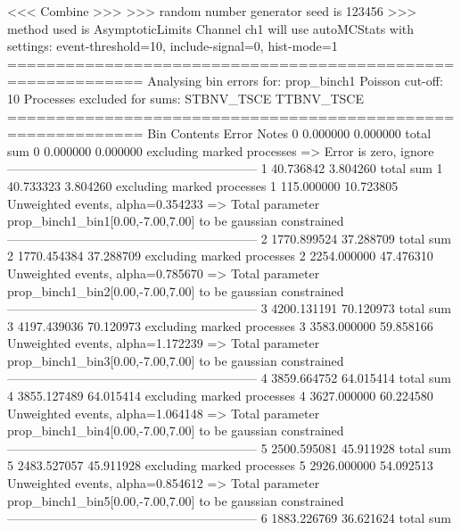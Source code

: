  <<< Combine >>> 
>>> random number generator seed is 123456
>>> method used is AsymptoticLimits
Channel ch1 will use autoMCStats with settings: event-threshold=10, include-signal=0, hist-mode=1
============================================================
Analysing bin errors for: prop_binch1
Poisson cut-off: 10
Processes excluded for sums: STBNV_TSCE TTBNV_TSCE
============================================================
Bin        Contents        Error           Notes                         
0          0.000000        0.000000        total sum                     
0          0.000000        0.000000        excluding marked processes    
  => Error is zero, ignore      
------------------------------------------------------------
1          40.736842       3.804260        total sum                     
1          40.733323       3.804260        excluding marked processes    
1          115.000000      10.723805       Unweighted events, alpha=0.354233
  => Total parameter prop_binch1_bin1[0.00,-7.00,7.00] to be gaussian constrained
------------------------------------------------------------
2          1770.899524     37.288709       total sum                     
2          1770.454384     37.288709       excluding marked processes    
2          2254.000000     47.476310       Unweighted events, alpha=0.785670
  => Total parameter prop_binch1_bin2[0.00,-7.00,7.00] to be gaussian constrained
------------------------------------------------------------
3          4200.131191     70.120973       total sum                     
3          4197.439036     70.120973       excluding marked processes    
3          3583.000000     59.858166       Unweighted events, alpha=1.172239
  => Total parameter prop_binch1_bin3[0.00,-7.00,7.00] to be gaussian constrained
------------------------------------------------------------
4          3859.664752     64.015414       total sum                     
4          3855.127489     64.015414       excluding marked processes    
4          3627.000000     60.224580       Unweighted events, alpha=1.064148
  => Total parameter prop_binch1_bin4[0.00,-7.00,7.00] to be gaussian constrained
------------------------------------------------------------
5          2500.595081     45.911928       total sum                     
5          2483.527057     45.911928       excluding marked processes    
5          2926.000000     54.092513       Unweighted events, alpha=0.854612
  => Total parameter prop_binch1_bin5[0.00,-7.00,7.00] to be gaussian constrained
------------------------------------------------------------
6          1883.226769     36.621624       total sum                     
